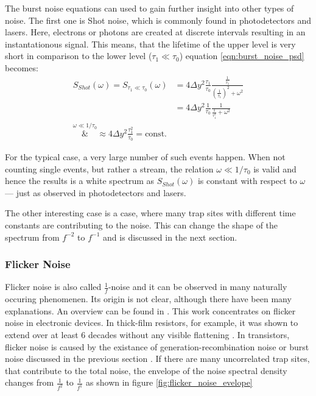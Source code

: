 The burst noise equations can used to gain further insight into other types of noise. The first one is Shot noise, which is commonly found in photodetectors and lasers. Here, electrons or photons are created at discrete intervals resulting in an instantationous signal. This means, that the lifetime of the upper level is very short in comparison to the lower level ($\tau_1 \ll \tau_0$) equation \ref{eqn:burst_noise_psd} becomes:
\begin{align}
    S_{Shot}(\omega) = S_{\tau_1 \ll \tau_0}(\omega) &= 4 \Delta y^2 \frac{\tau_1}{\tau_0} \frac{\frac{1}{\bar \tau_1}}{\left(\frac{1}{\bar \tau_1}\right)^2 + \omega^2}\nonumber\\
    &= 4 \Delta y^2 \frac{1}{\tau_0} \frac{1}{\frac{1}{\tau_1^2}+\omega^2}\\
    \overset{\omega \ll 1/\tau_0}&{\approx} 4 \Delta y^2 \frac{\tau_1^2}{\tau_0} = \text{const.}
\end{align}

For the typical case, a very large number of such events happen. When not counting single events, but rather a stream, the relation $\omega \ll 1/\tau_0$ is valid and hence the results is a white spectrum as $S_{Shot}(\omega)$ is constant with respect to $\omega$ --- just as observed in photodetectors and lasers.

The other interesting case is a case, where many trap sites with different time constants are contributing to the noise. This can change the shape of the spectrum from $f^{-2}$ to $f^{-1}$ and is discussed in the next section.

\clearpage
\subsubsection{Flicker Noise}
Flicker noise is also called $\frac 1 f$-noise and it can be observed in many naturally occuring phenomenen. Its origin is not clear, although there have been many explanations. An overview can be found in \cite{flicker_noise_overview, flicker_noise_overview2, origins_1_f_noise}. This work concentrates on flicker noise in electronic devices. In thick-film resistors, for example, it was shown to extend over at least 6 decades without any visible flattening \cite{1_f_noise_thick_film}. In transistors, flicker noise is caused by the existance of generation-recombination noise or burst noise discussed in the previous section \cite{origins_1_f_noise}. If there are many uncorrelated trap sites, that contribute to the total noise, the envelope of the noise spectral density changes from $\frac{1}{f^2}$ to $\frac{1}{f^1}$ as shown in figure \ref{fig:flicker_noise_evelope}

